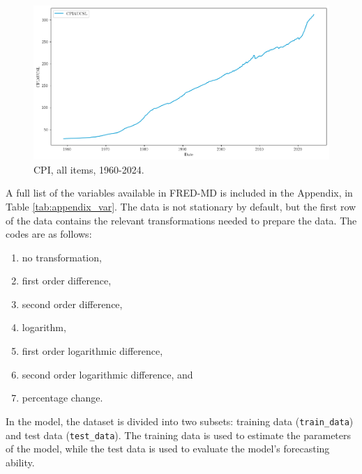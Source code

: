 \begin{figure}[H]
    \centering
    \includegraphics[width=1\linewidth]{figures/cpi.png}
    \vspace{-30pt}
    \caption{CPI, all items, 1960-2024.}
    \label{fig:cpi} 
\end{figure}

A full list of the variables available in FRED-MD is included in the Appendix, in Table \ref{tab:appendix_var}. The data is not stationary by default, but the first row of the data contains the relevant transformations needed to prepare the data. The codes are as follows:

\begin{enumerate}[itemsep=0pt,parsep=0pt,topsep=0pt,partopsep=0pt]
    \item no transformation,
    \item first order difference,
    \item second order difference,
    \item logarithm,
    \item first order logarithmic difference,
    \item second order logarithmic difference, and
    \item percentage change.
\end{enumerate}

In the model, the dataset is divided into two subsets: training data (\texttt{train\_data}) and test data (\texttt{test\_data}). The training data is used to estimate the parameters of the model, while the test data is used to evaluate the model's forecasting ability.


